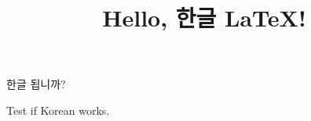 \documentclass[12pt]{article}
\begin{document}
\title{Hello, 한글 \LaTeX!}
\maketitle

한글 됩니까?

Test if Korean works.
\end{document}
